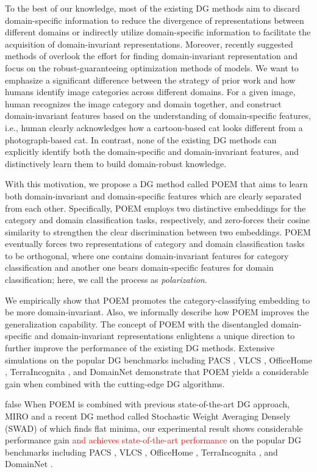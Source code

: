 \documentclass[letterpaper]{article} \usepackage{aaai23}  \usepackage{times}  \usepackage{helvet}  \usepackage{courier}  \usepackage[hyphens]{url}  \usepackage{graphicx} \urlstyle{rm} \def\UrlFont{\rm}  \usepackage{natbib}  \usepackage{caption} \frenchspacing  \setlength{\pdfpagewidth}{8.5in}  \setlength{\pdfpageheight}{11in}  \usepackage[labelsep=period]{caption}
\begin{document}
To the best of our knowledge, most of the existing DG methods aim to discard domain-specific information to reduce the divergence of representations between different domains or indirectly utilize domain-specific information to facilitate the acquisition of domain-invariant representations.
Moreover, recently suggested methods of \cite{SWAD,MIRO} overlook the effort for finding domain-invariant representation and focus on the robust-guaranteeing optimization methods of models.
We want to emphasize a significant difference between the strategy of prior work and how humans identify image categories across different domains.
For a given image, human recognizes the image category and domain together, and construct domain-invariant features based on the understanding of domain-specific features, i.e., human clearly acknowledges how a cartoon-based cat looks different from a photograph-based cat.
In contrast, none of the existing DG methods can explicitly identify both the domain-specific and domain-invariant features, and distinctively learn them to build domain-robust knowledge.

With this motivation, we propose a DG method called POEM that aims to learn both domain-invariant and domain-specific features which are clearly separated from each other.
Specifically, POEM employs two distinctive embeddings for the category and domain classification tasks, respectively, and zero-forces their cosine similarity to strengthen the clear discrimination between two embeddings.
POEM eventually forces two representations of category and domain classification tasks to be orthogonal, where one contains domain-invariant features for category classification and another one bears domain-specific features for domain classification; here, we call the process as \textit{polarization}.

We empirically show that POEM promotes the category-classifying embedding to be more domain-invariant. 
Also, we informally describe how POEM improves the generalization capability.
The concept of POEM with the disentangled domain-specific and domain-invariant representations enlightens a unique direction to further improve the performance of the existing DG methods. 
Extensive simulations on the popular DG benchmarks including PACS \cite{PACS}, VLCS \cite{VLCS}, OfficeHome \cite{officehome}, TerraIncognita \cite{terraincognita}, and DomainNet \cite{DomainNet} demonstrate that POEM yields a considerable gain when combined with the cutting-edge DG algorithms.


\if false
When POEM is combined with previous state-of-the-art DG approach, MIRO\cite{MIRO} and a recent DG method called Stochastic Weight Averaging Densely (SWAD) of \cite{SWAD} which finds flat minima, our experimental result shows considerable performance gain \textcolor{red}{and achieves state-of-the-art performance} on the popular DG benchmarks including PACS \cite{PACS}, VLCS \cite{VLCS}, OfficeHome \cite{officehome}, TerraIncognita \cite{terraincognita}, and DomainNet \cite{DomainNet}.
\fi
\end{document}
